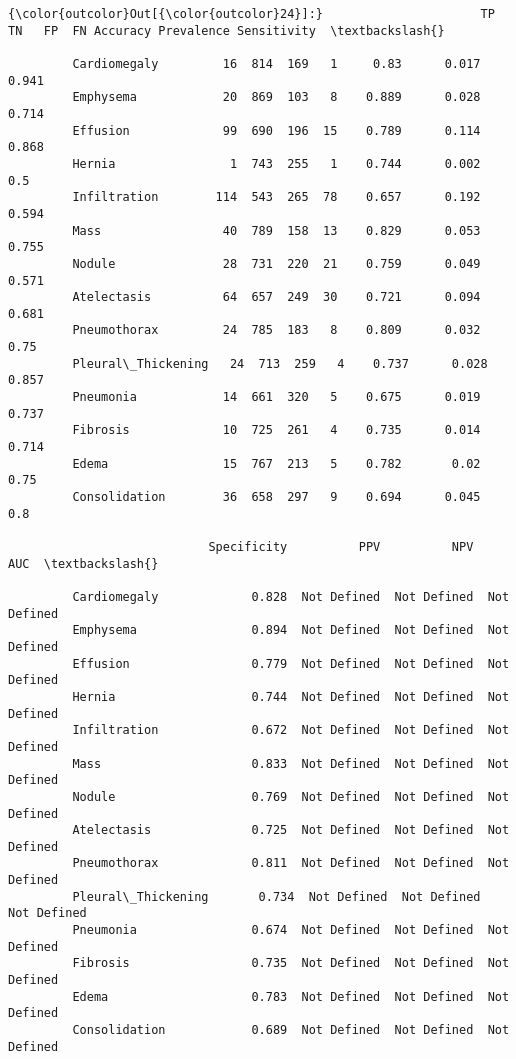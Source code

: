\documentclass[11pt]{article}
\begin{document}
\begin{Verbatim}[commandchars=\\\{\}]
{\color{outcolor}Out[{\color{outcolor}24}]:}                      TP   TN   FP  FN Accuracy Prevalence Sensitivity  \textbackslash{}
                                                                                 
         Cardiomegaly         16  814  169   1     0.83      0.017       0.941   
         Emphysema            20  869  103   8    0.889      0.028       0.714   
         Effusion             99  690  196  15    0.789      0.114       0.868   
         Hernia                1  743  255   1    0.744      0.002         0.5   
         Infiltration        114  543  265  78    0.657      0.192       0.594   
         Mass                 40  789  158  13    0.829      0.053       0.755   
         Nodule               28  731  220  21    0.759      0.049       0.571   
         Atelectasis          64  657  249  30    0.721      0.094       0.681   
         Pneumothorax         24  785  183   8    0.809      0.032        0.75   
         Pleural\_Thickening   24  713  259   4    0.737      0.028       0.857   
         Pneumonia            14  661  320   5    0.675      0.019       0.737   
         Fibrosis             10  725  261   4    0.735      0.014       0.714   
         Edema                15  767  213   5    0.782       0.02        0.75   
         Consolidation        36  658  297   9    0.694      0.045         0.8   
         
                            Specificity          PPV          NPV          AUC  \textbackslash{}
                                                                                 
         Cardiomegaly             0.828  Not Defined  Not Defined  Not Defined   
         Emphysema                0.894  Not Defined  Not Defined  Not Defined   
         Effusion                 0.779  Not Defined  Not Defined  Not Defined   
         Hernia                   0.744  Not Defined  Not Defined  Not Defined   
         Infiltration             0.672  Not Defined  Not Defined  Not Defined   
         Mass                     0.833  Not Defined  Not Defined  Not Defined   
         Nodule                   0.769  Not Defined  Not Defined  Not Defined   
         Atelectasis              0.725  Not Defined  Not Defined  Not Defined   
         Pneumothorax             0.811  Not Defined  Not Defined  Not Defined   
         Pleural\_Thickening       0.734  Not Defined  Not Defined  Not Defined   
         Pneumonia                0.674  Not Defined  Not Defined  Not Defined   
         Fibrosis                 0.735  Not Defined  Not Defined  Not Defined   
         Edema                    0.783  Not Defined  Not Defined  Not Defined   
         Consolidation            0.689  Not Defined  Not Defined  Not Defined   
         

\end{Verbatim}
\end{document}
